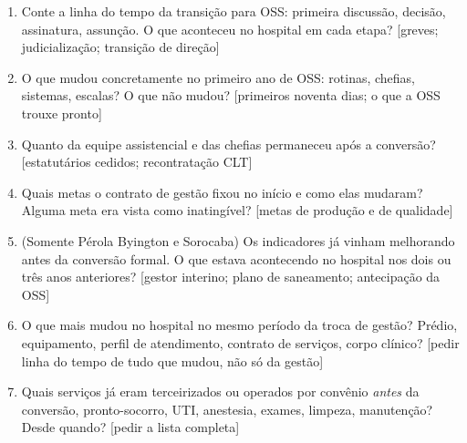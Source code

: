 \begin{enumerate}[itemsep=2pt]
  \item Conte a linha do tempo da transição para OSS: primeira discussão, decisão, assinatura, assunção. O que aconteceu no hospital em cada etapa? [greves; judicialização; transição de direção]
  \par\nopagebreak{}
  \item O que mudou concretamente no primeiro ano de OSS: rotinas, chefias, sistemas, escalas? O que não mudou? [primeiros noventa dias; o que a OSS trouxe pronto]
  \par\nopagebreak{}
  \item Quanto da equipe assistencial e das chefias permaneceu após a conversão? [estatutários cedidos; recontratação CLT]
  \par\nopagebreak{}
  \item Quais metas o contrato de gestão fixou no início e como elas mudaram? Alguma meta era vista como inatingível? [metas de produção e de qualidade]
  \par\nopagebreak{}
  \item (Somente Pérola Byington e Sorocaba) Os indicadores já vinham melhorando antes da conversão formal. O que estava acontecendo no hospital nos dois ou três anos anteriores? [gestor interino; plano de saneamento; antecipação da OSS]
  \par\nopagebreak{}
  \item O que mais mudou no hospital no mesmo período da troca de gestão? Prédio, equipamento, perfil de atendimento, contrato de serviços, corpo clínico? [pedir linha do tempo de tudo que mudou, não só da gestão]
  \par\nopagebreak{}
  \item Quais serviços já eram terceirizados ou operados por convênio \emph{antes} da conversão, pronto-socorro, UTI, anestesia, exames, limpeza, manutenção? Desde quando? [pedir a lista completa]
  \par\nopagebreak{}
\end{enumerate}

